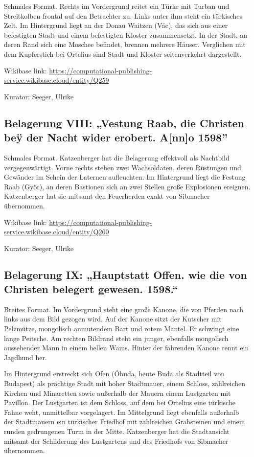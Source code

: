 \documentclass[
  11pt,
  a4paper,
  openany]{book}
\begin{document}
Schmales Format. Rechts im Vordergrund reitet ein Türke mit Turban und
Streitkolben frontal auf den Betrachter zu. Links unter ihm steht ein
türkisches Zelt. Im Hintergrund liegt an der Donau Waitzen (Vác), das
sich aus einer befestigten Stadt und einem befestigten Kloster
zusammensetzt. In der Stadt, an deren Rand sich eine Moschee befindet,
brennen mehrere Häuser. Verglichen mit dem Kupferstich bei Ortelius sind
Stadt und Kloster seitenverkehrt dargestellt.

Wikibase link:
\url{https://computational-publishing-service.wikibase.cloud/entity/Q259}

Kurator: Seeger, Ulrike

\subsection{Belagerung VIII: „Vestung Raab, die Christen beÿ der Nacht
wider erobert. A{[}nn{]}o
1598''}\label{belagerung-viii-vestung-raab-die-christen-beuxff-der-nacht-wider-erobert.-anno-1598}

Schmales Format. Katzenberger hat die Belagerung effektvoll als
Nachtbild vergegenwärtigt. Vorne rechts stehen zwei Wachsoldaten, deren
Rüstungen und Gewänder im Schein der Laternen aufleuchten. Im
Hintergrund liegt die Festung Raab (Győr), an deren Bastionen sich an
zwei Stellen große Explosionen ereignen. Katzenberger hat sie mitsamt
den Feuerherden exakt von Sibmacher übernommen.

Wikibase link:
\url{https://computational-publishing-service.wikibase.cloud/entity/Q260}

Kurator: Seeger, Ulrike

\subsection{Belagerung IX: „Hauptstatt Offen. wie die von Christen
belegert gewesen.
1598.``}\label{belagerung-ix-hauptstatt-offen.-wie-die-von-christen-belegert-gewesen.-1598.}

Breites Format. Im Vordergrund steht eine große Kanone, die von Pferden
nach links aus dem Bild gezogen wird. Auf der Kanone sitzt der Kutscher
mit Pelzmütze, mongolisch anmutendem Bart und rotem Mantel. Er schwingt
eine lange Peitsche. Am rechten Bildrand steht ein junger, ebenfalls
mongolisch aussehender Mann in einem hellen Wams. Hinter der fahrenden
Kanone rennt ein Jagdhund her.

Im Hintergrund erstreckt sich Ofen (Óbuda, heute Buda als Stadtteil von
Budapest) als prächtige Stadt mit hoher Stadtmauer, einem Schloss,
zahlreichen Kirchen und Minaretten sowie außerhalb der Mauern einem
Lustgarten mit Pavillon. Der Lustgarten ist dem Schloss, auf dem bei
Ortelius eine türkische Fahne weht, unmittelbar vorgelagert. Im
Mittelgrund liegt ebenfalls außerhalb der Stadtmauern ein türkischer
Friedhof mit zahlreichen Grabsteinen und einem runden gedrungenen Turm
in der Mitte. Katzenberger hat die Stadtansicht mitsamt der Schilderung
des Lustgartens und des Friedhofs von Sibmacher übernommen.
\end{document}
